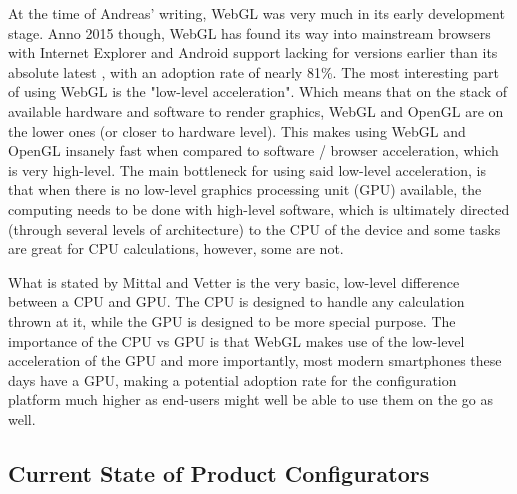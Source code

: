 At the time of Andreas' writing, WebGL was very much in its early development stage. Anno 2015 though, WebGL has found its way into mainstream browsers with Internet Explorer and Android support lacking for versions earlier than its absolute latest \cite{Can I Use}, with an adoption rate of nearly 81\%. The most interesting part of using WebGL is the "low-level acceleration". Which means that on the stack of available hardware and software to render graphics, WebGL and OpenGL are on the lower ones (or closer to hardware level). This makes using WebGL and OpenGL insanely fast when compared to software / browser acceleration, which is very high-level.
The main bottleneck for using said low-level acceleration, is that when there is no low-level graphics processing unit (GPU) available, the computing needs to be done with high-level software, which is ultimately directed (through several levels of architecture) to the CPU of the device and some tasks are great for CPU calculations, however, some are not.
\newline

\cite{Heterogeneous Computing Techniques}
\newline

What is stated by Mittal and Vetter is the very basic, low-level difference between a CPU and GPU. The CPU is designed to handle any calculation thrown at it, while the GPU is designed to be more special purpose.
The importance of the CPU vs GPU is that WebGL makes use of the low-level acceleration of the GPU and more importantly, most modern smartphones these days have a GPU, making a potential adoption rate for the configuration platform much higher as end-users might well be able to use them on the go as well.

\subsection{Current State of Product Configurators}

\newpage